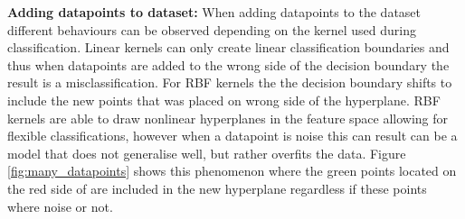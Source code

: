\documentclass{article}
\begin{document}
        \noindent\textbf{Adding datapoints to dataset:}\newline
        When adding datapoints to the dataset different behaviours can be observed depending on the kernel used during classification. Linear kernels can only create linear classification boundaries and thus when datapoints are added to the wrong side of the decision boundary the result is a misclassification. For RBF kernels the the decision boundary shifts to include the new points that was placed on wrong side of the hyperplane. RBF kernels are able to draw nonlinear hyperplanes in the feature space allowing for flexible classifications, however when a datapoint is noise this can result can be a model that does not generalise well, but rather overfits the data. Figure \ref{fig:many_datapoints} shows this phenomenon where the green points located on the red side of are included in the new hyperplane regardless if these points where noise or not. 
        
\end{document}
